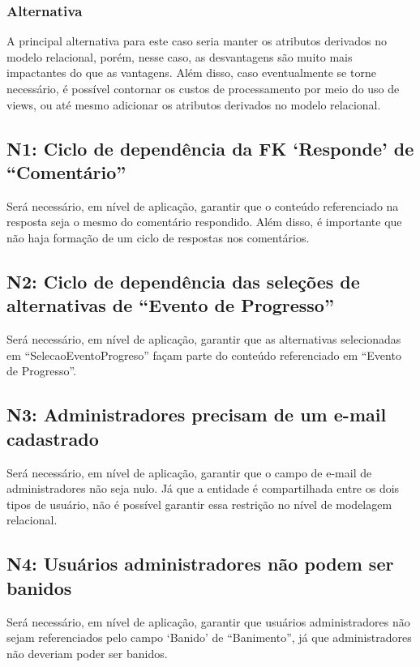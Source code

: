 \subsubsection{Alternativa}

A principal alternativa para este caso seria manter os atributos derivados no 
modelo relacional, porém, nesse caso, as desvantagens são muito mais impactantes
do que as vantagens. Além disso, caso eventualmente se torne necessário, é possível
contornar os custos de processamento por meio do uso de views, ou até mesmo adicionar
os atributos derivados no modelo relacional. 

\subsection{\textbf{N1:} Ciclo de dependência da FK `Responde' de ``Comentário''}

Será necessário, em nível de aplicação, garantir que o conteúdo referenciado na
resposta seja o mesmo do comentário respondido. Além disso, é importante que
não haja formação de um ciclo de respostas nos comentários.

\subsection{\textbf{N2:} Ciclo de dependência das seleções de alternativas de ``Evento de Progresso''}

Será necessário, em nível de aplicação, garantir que as alternativas
selecionadas em ``SelecaoEventoProgreso'' façam parte do conteúdo referenciado
em ``Evento de Progresso''.

\subsection{\textbf{N3:} Administradores precisam de um e-mail cadastrado}

Será necessário, em nível de aplicação, garantir que o campo de e-mail de
administradores não seja nulo. Já que a entidade é compartilhada entre os dois
tipos de usuário, não é possível garantir essa restrição no nível de modelagem
relacional.

\subsection{\textbf{N4:} Usuários administradores não podem ser banidos}

Será necessário, em nível de aplicação, garantir que usuários administradores
não sejam referenciados pelo campo `Banido' de ``Banimento'', já que
administradores não deveriam poder ser banidos.

